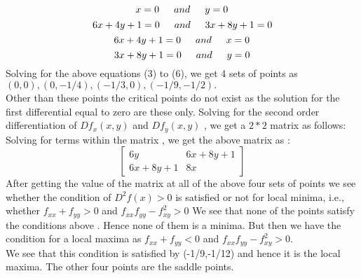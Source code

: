\documentclass[letterpaper,12pt]{article}
\theoremstyle{definition}
\begin{document}
\begin{equation}
    x = 0 \indent and \indent y = 0
\end{equation}
\begin{equation}
    6x + 4y + 1 = 0\indent and\indent 3x+ 8y+ 1 = 0
\end{equation}
\begin{equation}
    6x +4y +1 = 0\indent and\indent x = 0
\end{equation}
 \begin{equation}
    3x+ 8y +1 = 0\indent and\indent y = 0
 \end{equation}
 \newline
 Solving for the above equations (3) to (6),  we get 4 sets of points as \\ $ (0, 0), (0, -1/4), (-1/3, 0), (-1/9, -1/2).$\\  Other than these points the critical points do not exist as the solution for the first differential equal to zero are these only.
\newline
\doublespacing
Solving for the second order differentiation of $ Df_{x}(x,y)$ and $Df_{y}(x,y)$ , we get a $2  *  2 $ matrix  as follows:
\vspace{2mm}
\newline
Solving for terms within the matrix , we get the above matrix as :
\newline
\begin{equation*}
\left[
\begin{matrix}
6y &6x+8y+1\\
6x+8y+1 &8x
\end{matrix}
\right]
\end{equation*}
\newline
After getting the value of the matrix at all of the above four sets of points we see whether the condition of $D^2f(x) > 0$ is satisfied or not for local minima, i.e., \newline
whether $ f_{xx} + f_{yy} > 0 $  and  $f_{xx}f_{yy} - f_{xy}^2 > 0$
\newline
We see that none of the points satisfy the conditions above . Hence none of them is a minima. But then we have the condition for a local maxima as
$ f_{xx} + f_{yy} < 0 $  and  $f_{xx}f_{yy} - f_{xy}^2 > 0$.\\
We see that this condition is satisfied by (-1/9,-1/12) and hence it is the local maxima. The other four points are the saddle points.
\end{document}
